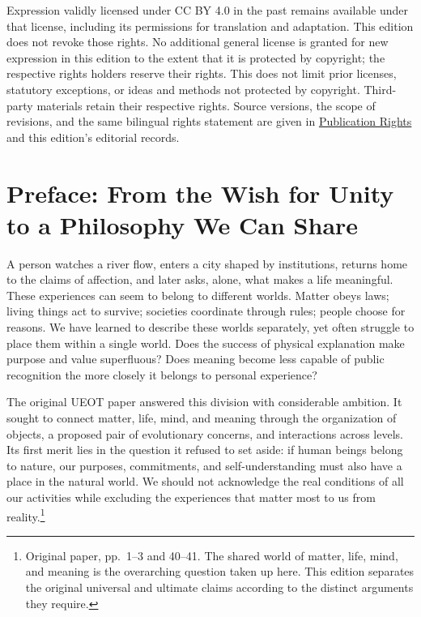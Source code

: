 \documentclass[
  english,
  11pt,
  oneside]{book}
\begin{document}
Expression validly licensed under CC BY 4.0 in the past remains available under that license, including its permissions for translation and adaptation. This edition does not revoke those rights. No additional general license is granted for new expression in this edition to the extent that it is protected by copyright; the respective rights holders reserve their rights. This does not limit prior licenses, statutory exceptions, or ideas and methods not protected by copyright. Third-party materials retain their respective rights. Source versions, the scope of revisions, and the same bilingual rights statement are given in \href{https://github.com/MurphyHoops/UEOT/blob/pub/philosophy-bilingual-edition/philosophy/PUBLICATION_RIGHTS.md}{Publication Rights} and this edition's editorial records.

\par\endgroup

\chapter{Preface: From the Wish for Unity to a Philosophy We Can Share}\label{ph-preface}

A person watches a river flow, enters a city shaped by institutions, returns home to the claims of affection, and later asks, alone, what makes a life meaningful. These experiences can seem to belong to different worlds. Matter obeys laws; living things act to survive; societies coordinate through rules; people choose for reasons. We have learned to describe these worlds separately, yet often struggle to place them within a single world. Does the success of physical explanation make purpose and value superfluous? Does meaning become less capable of public recognition the more closely it belongs to personal experience?

The original UEOT paper answered this division with considerable ambition. It sought to connect matter, life, mind, and meaning through the organization of objects, a proposed pair of evolutionary concerns, and interactions across levels. Its first merit lies in the question it refused to set aside: if human beings belong to nature, our purposes, commitments, and self-understanding must also have a place in the natural world. We should not acknowledge the real conditions of all our activities while excluding the experiences that matter most to us from reality.\footnote{\hypertarget{ph-note-2}{}Original paper, pp.~1--3 and 40--41. The shared world of matter, life, mind, and meaning is the overarching question taken up here. This edition separates the original universal and ultimate claims according to the distinct arguments they require.}
\end{document}
